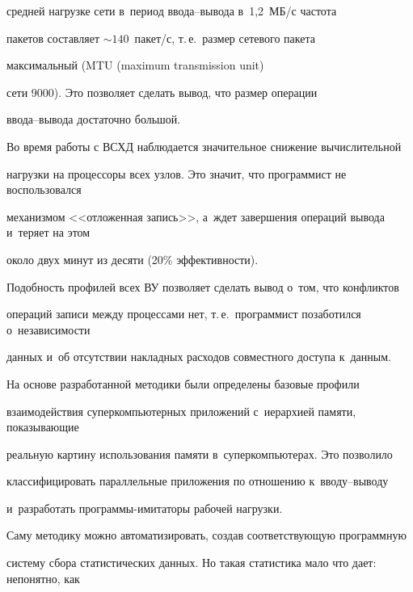 средней нагрузке сети в~период вво\-да--вы\-во\-да в~1,2~МБ\!/\!с частота


пакетов составляет $\sim140$~пакет\!/\!с, т.\,е.\ размер сетевого пакета


максимальный (MTU (maximum transmission unit)


сети 9000). Это позволяет сделать вывод, что размер операции


      вво\-да--вы\-во\-да достаточно большой.





      Во время работы с ВСХД наблюдается значительное снижение вычислительной


нагрузки на процессоры всех узлов. Это значит, что программист не воспользовался


механизмом <<отложенная запись>>, а~ждет завершения операций вывода и~теряет на этом


около двух минут из десяти (20\% эффективности).





      Подобность профилей всех ВУ позволяет сделать вывод о~том, что конфликтов


операций записи между процессами нет, т.\,е.\ программист позаботился о~независимости


данных и~об отсутствии накладных расходов совместного доступа к~данным.











      На основе разработанной методики были определены базовые профили


взаимодействия суперкомпьютерных приложений с~иерархией памяти, показывающие


реальную картину использования памяти в~суперкомпьютерах. Это позволило


классифицировать параллельные приложения по отношению к~вво\-ду--вы\-во\-ду


и~разработать про\-грам\-мы-ими\-та\-то\-ры рабочей нагрузки.





      Саму методику можно автоматизировать, создав соответствующую прог\-рам\-мную


систему сбора статистических данных. Но такая статистика мало что дает: непонятно, как


